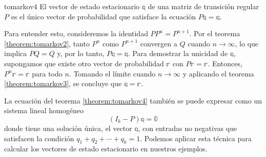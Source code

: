 \begin{theorem}{}{tomarkov4}
    El vector de estado estacionario $\mathbb{q}$ de una matriz de transición regular $P$ es el único vector de probabilidad que satisface la ecuación $P \mathbb{q} = \mathbb{q}$.
\end{theorem}

Para entender esto, consideremos la identidad $PP^n = P^{n+1}$. Por el teorema \ref{theorem:tomarkov2}, tanto $P^n$ como $P^{n+1}$ convergen a $Q$ cuando $n \to \infty$, lo que implica $PQ = Q$ y, por lo tanto, $P\mathbb{q} = \mathbb{q}$. Para demostrar la unicidad de $\mathbb{q}$, supongamos que existe otro vector de probabilidad $\mathbb{r}$ con $P\mathbb{r} = \mathbb{r}$. Entonces, $P^n\mathbb{r} = \mathbb{r}$ para todo $n$. Tomando el límite cuando $n \to \infty$ y aplicando el teorema \ref{theorem:tomarkov3}, se concluye que $\mathbb{q} = \mathbb{r}$.

\newpage

La ecuación del teorema \ref{theorem:tomarkov4} también se puede expresar como un sistema lineal homogéneo
$$(I_k - P)\mathbb{q} = \mathbb{0}$$
donde tiene una solución única, el vector $\mathbb{q}$, con entradas no negativas que satisfacen la condición $q_1 + q_2 + \cdots + q_k = 1$. Podemos aplicar esta técnica para calcular los vectores de estado estacionario en nuestros ejemplos.

